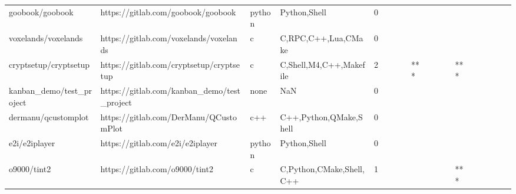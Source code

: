 \begin{tabular}{llllrlllllllllllll}
goobook/goobook                                    &                 https://gitlab.com/goobook/goobook &            python &                                       Python,Shell &       0 &         &        &           &                &                 &        &           &           &          &          &       &              &          \\
voxelands/voxelands                                &             https://gitlab.com/voxelands/voxelands &                 c &                                C,RPC,C++,Lua,CMake &       0 &         &        &           &                &                 &        &           &           &          &          &       &              &          \\
cryptsetup/cryptsetup                              &           https://gitlab.com/cryptsetup/cryptsetup &                 c &                            C,Shell,M4,C++,Makefile &       2 &         &        &           &            *** &                 &        &           &       *** &          &          &       &              &          \\
kanban\_demo/test\_project                           &        https://gitlab.com/kanban\_demo/test\_project &              none &                                                NaN &       0 &         &        &           &                &                 &        &           &           &          &          &       &              &          \\
dermanu/qcustomplot                                &             https://gitlab.com/DerManu/QCustomPlot &               c++ &                             C++,Python,QMake,Shell &       0 &         &        &           &                &                 &        &           &           &          &          &       &              &          \\
e2i/e2iplayer                                      &                   https://gitlab.com/e2i/e2iplayer &            python &                                       Python,Shell &       0 &         &        &           &                &                 &        &           &           &          &          &       &              &          \\
o9000/tint2                                        &                     https://gitlab.com/o9000/tint2 &                 c &                           C,Python,CMake,Shell,C++ &       1 &         &        &           &                &                 &        &           &       *** &          &          &       &              &          \\

\end{tabular}
